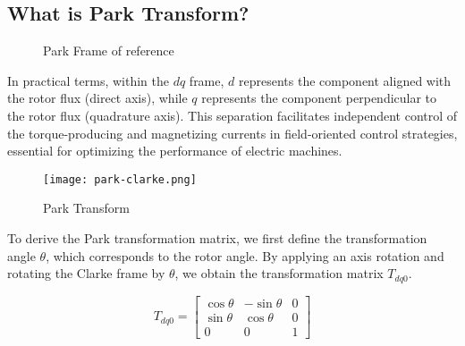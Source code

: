 \subsection{What is Park Transform?}
\begin{figure}[ht]
    \centering
    \caption{Park Frame of reference}
    \label{Park Frame of reference}
\end{figure}


In practical terms, within the \( dq \) frame, \( d \) represents the component
aligned with the rotor flux (direct axis), while \( q \) represents the
component perpendicular to the rotor flux (quadrature axis). This separation
facilitates independent control of the torque-producing and magnetizing
currents in field-oriented control strategies, essential for optimizing the
performance of electric machines.
\begin{figure}[ht]
    \centering
    \texttt{[image: park-clarke.png]}
    \caption{Park Transform}
    \label{fig:Park Transform}
\end{figure}

To derive the Park transformation matrix, we first define the transformation
angle \( \theta \), which corresponds to the rotor angle. By applying an axis
rotation and rotating the Clarke frame by \( \theta \), we obtain the
transformation matrix \( T_{dq0} \).

\begin{equation*}
    T_{dq0} =
    \begin{bmatrix}
        \cos \theta & -\sin \theta & 0 \\
        \sin \theta & \cos \theta  & 0 \\
        0           & 0            & 1
    \end{bmatrix}
\end{equation*}

